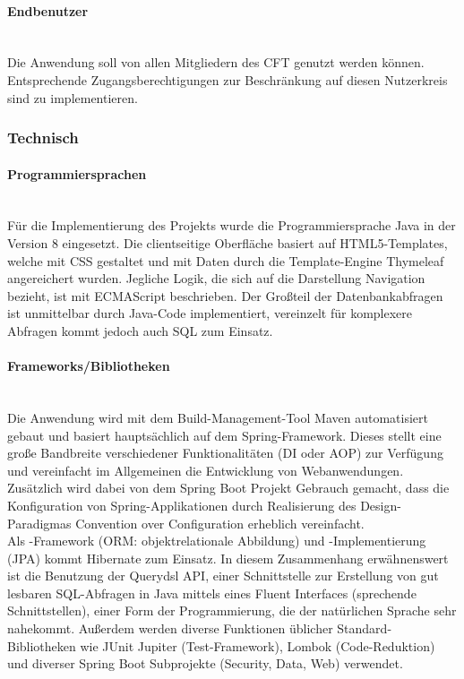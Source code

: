 \paragraph{Endbenutzer}~\\\label{p:Endbenutzer}
Die Anwendung \projektName soll von allen Mitgliedern des \ac{CFT} \teamName genutzt werden können. Entsprechende Zugangsberechtigungen zur Beschränkung auf diesen Nutzerkreis sind zu implementieren.

\subsubsection{Technisch}\label{sec:Projektschnittstellen:Technisch}

\paragraph{Programmiersprachen}~\\\label{p:Programmiersprachen}
Für die Implementierung des Projekts wurde die Programmiersprache Java in der Version 8 eingesetzt. Die clientseitige Oberfläche basiert auf HTML5-Templates, welche mit CSS gestaltet und mit Daten durch die Template-Engine Thymeleaf angereichert wurden. Jegliche Logik, die sich auf die Darstellung \bzw Navigation bezieht, ist mit ECMAScript beschrieben. Der Großteil der Datenbankabfragen ist unmittelbar durch Java-Code implementiert, vereinzelt für komplexere Abfragen kommt jedoch auch SQL zum Einsatz.

\paragraph{Frameworks/Bibliotheken}~\\\label{p:Frameworks}
Die Anwendung wird mit dem Build-Management-Tool Maven automatisiert gebaut und basiert hauptsächlich auf dem Spring-Framework. Dieses stellt eine große Bandbreite verschiedener Funktionalitäten (\zB \ac{DI} oder \ac{AOP}) zur Verfügung und vereinfacht im Allgemeinen die Entwicklung von Webanwendungen.\\
Zusätzlich wird dabei von dem Spring Boot Projekt Gebrauch gemacht, dass die Konfiguration von Spring-Applikationen durch Realisierung des Design-Paradigmas Convention over Configuration erheblich vereinfacht.\\
Als -Framework (\ac{ORM}: objektrelationale Abbildung) und -Implementierung (\ac{JPA}) kommt Hibernate zum Einsatz. In diesem Zusammenhang erwähnenswert ist die Benutzung der Querydsl API, einer Schnittstelle zur Erstellung von gut lesbaren SQL-Abfragen in Java mittels eines Fluent Interfaces (sprechende Schnittstellen), einer Form der Programmierung, die der natürlichen Sprache sehr nahekommt.
Außerdem werden diverse Funktionen üblicher Standard-Bibliotheken wie JUnit Jupiter (Test-Framework), Lombok (Code-Reduktion) und diverser Spring Boot Subprojekte (Security, Data, Web) verwendet.



